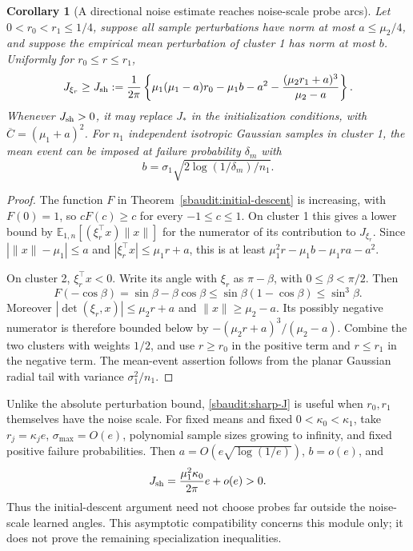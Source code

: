 \documentclass{article} %
\theoremstyle{plain}
\newtheorem{corollary}[theorem]{Corollary}
\theoremstyle{definition}
\theoremstyle{remark}
\begin{document}
\begin{corollary}[A directional noise estimate reaches noise-scale probe arcs]
\label{sbaudit:sharp-noise}
Let $0<r_0<r_1\le1/4$, suppose all sample perturbations have norm at most
$a\le\mu_2/4$, and suppose the empirical mean perturbation of cluster 1
has norm at most $b$. Uniformly for $r_0\le r\le r_1$,
\begin{equation}\label{sbaudit:sharp-J}
 J_{\xi_r}\ge J_{\rm sh}:=\frac1{2\pi}
 \left\{\mu_1(\mu_1-a)r_0-\mu_1b-a^2
              -\frac{(\mu_2r_1+a)^3}{\mu_2-a}\right\}.
\end{equation}
Whenever $J_{\rm sh}>0$, it may replace $J_*$ in the initialization
conditions, with $\overline C=(\mu_1+a)^2$.
For $n_1$ independent isotropic Gaussian samples in cluster 1, the mean
event can be imposed at failure probability $\delta_m$ with
\[
 b=\sigma_1\sqrt{2\log(1/\delta_m)/n_1}.
\]
\end{corollary}
\begin{proof}
The function $F$ in Theorem~\ref{sbaudit:initial-descent} is increasing,
with $F(0)=1$, so $cF(c)\ge c$ for every $-1\le c\le1$.
On cluster 1 this gives a lower bound by
$\mathbb E_{1,n}[(\xi_r^\top x)\|x\|]$ for the numerator of its
contribution to $J_{\xi_r}$. Since
$|\|x\|-\mu_1|\le a$ and $|\xi_r^\top x|\le\mu_1r+a$,
this is at least
$\mu_1^2r-\mu_1b-\mu_1ra-a^2$.

On cluster 2, $\xi_r^\top x<0$. Write its angle with $\xi_r$ as
$\pi-\beta$, with $0\le\beta<\pi/2$. Then
\[
 F(-\cos\beta)=\sin\beta-\beta\cos\beta
 \le\sin\beta(1-\cos\beta)\le\sin^3\beta.
\]
Moreover $|\det(\xi_r,x)|\le\mu_2r+a$ and $\|x\|\ge\mu_2-a$.
Its possibly negative numerator is therefore bounded below by
$-(\mu_2r+a)^3/(\mu_2-a)$. Combine the two clusters with weights
$1/2$, and use $r\ge r_0$ in the positive term and $r\le r_1$ in the
negative term. The mean-event assertion follows from the planar
Gaussian radial tail with variance $\sigma_1^2/n_1$.
\end{proof}

Unlike the absolute perturbation bound, \eqref{sbaudit:sharp-J} is useful
when $r_0,r_1$ themselves have the noise scale. For fixed means and fixed
$0<\kappa_0<\kappa_1$, take $r_j=\kappa_j e$,
$\sigma_{\max}=O(e)$, polynomial sample sizes growing to infinity,
and fixed positive failure probabilities. Then
$a=O(e\sqrt{\log(1/e)})$, $b=o(e)$, and
\[
 J_{\rm sh}=\frac{\mu_1^2\kappa_0}{2\pi}e+o(e)>0.
\]
Thus the initial-descent argument need not choose probes far outside the
noise-scale learned angles. This asymptotic compatibility concerns this
module only; it does not prove the remaining specialization inequalities.
\end{document}
